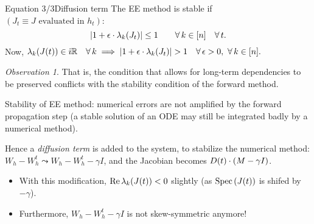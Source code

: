 \documentclass[10pt,xcolor={table,dvipsnames}]{beamer} 		%
\theoremstyle{plain}					%
\theoremstyle{definition}
\theoremstyle{remark}
\newtheorem{oss}{Observation}[section]
\newcommand{\iu}{\dot{\imath}}
\begin{document}
	\begin{frame}{Equation 3/3}{Diffusion term}
		The EE method is 
		\alert{stable} if {\smaller $(J_t\equiv J\text{ evaluated in }h_t)$}:
		\[
			\abs{1+\epsilon\cdot\lambda_k\qty(J_t)}\le 1\qquad\forall\,k\in[n]\quad\forall\,t.
		\]
		Now,
			$\lambda_k\qty(J(t))\in \iu\R\quad\forall\,k\implies\abs{1+\epsilon\cdot\lambda_k\qty(J_t)}>1\quad\forall\,\epsilon>0,\ \forall\,k\in[n].$

		\begin{oss}
			That is, the condition that allows for long-term dependencies to be preserved conflicts with 
			the stability condition of the forward method.
			\smallskip

			Stability of EE method: numerical errors are not amplified by the 
			forward propagation step {\smaller (a stable solution of an ODE may still be integrated 
			badly by a numerical method)}.
		\end{oss}

		Hence a \emph{diffusion term} is added to the system, 
		to stabilize the numerical method:
		$W_h-W_h^t\leadsto W_h-W_h^t-\gamma I$, and the Jacobian becomes $D(t)\cdot\qty(M-\gamma I)$.
		\smallskip 

		\begin{itemize}
			\item With this modification, $\Re\lambda_k\qty(J(t))<0$ slightly 
			{\smaller (as $\operatorname{Spec}\qty(J(t))$ is shifed by $-\gamma$)}.
			\item Furthermore, $W_h-W_h^t-\gamma I$ is not skew-symmetric anymore!
		\end{itemize}
	\end{frame}
\end{document}
